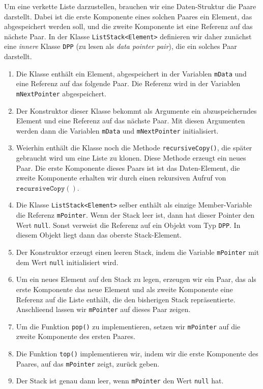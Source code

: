 Um eine verkette Liste darzustellen, brauchen wir eine Daten-Struktur die Paare darstellt.
Dabei ist die erste Komponente eines solchen Paares ein Element, das abgespeichert werden
soll, und die zweite Komponente ist eine Referenz auf das n\"achste Paar.
In der Klasse \texttt{ListStack<Element>} definieren wir daher zun\"achst 
eine \emph{innere} Klasse \texttt{DPP} (zu lesen als \emph{data pointer pair}),
die ein solches Paar darstellt.
\begin{enumerate}
\item Die Klasse enth\"alt ein Element, abgespeichert in der Variablen \texttt{mData}
      und eine Referenz auf das folgende Paar.  Die Referenz wird in der Variablen
      \texttt{mNextPointer} abgespeichert.
\item Der Konstruktor dieser Klasse bekommt als Argumente ein abzuspeicherndes Element
      und eine Referenz auf das n\"achste Paar.  Mit diesen Argumenten werden dann die
      Variablen \texttt{mData} und \texttt{mNextPointer} initialisiert.
\item Weierhin enth\"alt die Klasse noch die Methode \texttt{recursiveCopy()},
      die sp\"ater gebraucht wird um eine Liste zu klonen.  Diese Methode erzeugt ein neues
      Paar.  Die erste Komponente dieses Paars ist ist das Daten-Element, die zweite
      Komponente erhalten wir durch einen rekursiven Aufruf von
      $\texttt{recursiveCopy}()$.  
\item Die Klasse \texttt{ListStack<Element>} selber enth\"alt als einzige Member-Variable
      die Referenz \texttt{mPointer}.  Wenn der Stack leer ist, dann hat dieser Pointer
      den Wert \texttt{null}. Sonst verweist die Referenz auf ein Objekt vom Typ \texttt{DPP}.
      In diesem Objekt liegt dann das oberste Stack-Element.
\item Der Konstruktor erzeugt einen leeren Stack, indem die Variable \texttt{mPointer} mit
      dem Wert \texttt{null} initialisiert wird.
\item Um ein neues Element auf den Stack zu legen, erzeugen wir ein Paar, das als erste
      Komponente das neue Element und als zweite Komponente eine Referenz auf die Liste
      enth\"alt, die den bisherigen Stack repr\"asentierte.  Anschlie\3end lassen wir
      \texttt{mPointer} auf dieses Paar zeigen.
\item Um die Funktion \texttt{pop()} zu implementieren, setzen wir \texttt{mPointer}
      auf die zweite Komponente des ersten Paares.
\item Die Funktion \texttt{top()} implementieren wir, indem wir die erste Komponente des
      Paares, auf das \texttt{mPointer} zeigt, zur\"uck geben.
\item Der Stack ist genau dann leer, wenn \texttt{mPointer} den Wert \texttt{null} hat.
\end{enumerate}
